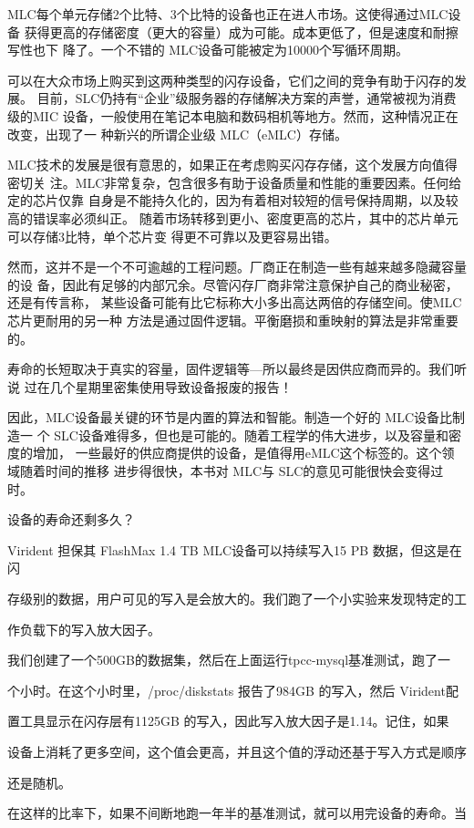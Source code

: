 MLC每个单元存储2个比特、3个比特的设备也正在进人市场。这使得通过MLC设备
获得更高的存储密度（更大的容量）成为可能。成本更低了，但是速度和耐擦写性也下
降了。一个不错的 MLC设备可能被定为10000个写循环周期。

可以在大众市场上购买到这两种类型的闪存设备，它们之间的竞争有助于闪存的发展。
目前，SLC仍持有“企业”级服务器的存储解决方案的声誉，通常被视为消费级的MIC
设备，一般使用在笔记本电脑和数码相机等地方。然而，这种情况正在改变，出现了一
种新兴的所谓企业级 MLC（eMLC）存储。

MLC技术的发展是很有意思的，如果正在考虑购买闪存存储，这个发展方向值得密切关
注。MLC非常复杂，包含很多有助于设备质量和性能的重要因素。任何给定的芯片仅靠
自身是不能持久化的，因为有着相对较短的信号保持周期，以及较高的错误率必须纠正。
随着市场转移到更小、密度更高的芯片，其中的芯片单元可以存储3比特，单个芯片变
得更不可靠以及更容易出错。

然而，这并不是一个不可逾越的工程问题。厂商正在制造一些有越来越多隐藏容量的设
备，因此有足够的内部冗余。尽管闪存厂商非常注意保护自己的商业秘密，还是有传言称，
某些设备可能有比它标称大小多出高达两倍的存储空间。使MLC芯片更耐用的另一种
方法是通过固件逻辑。平衡磨损和重映射的算法是非常重要的。

寿命的长短取决于真实的容量，固件逻辑等—所以最终是因供应商而异的。我们听说
过在几个星期里密集使用导致设备报废的报告！

因此，MLC设备最关键的环节是内置的算法和智能。制造一个好的 MLC设备比制造一
个 SLC设备难得多，但也是可能的。随着工程学的伟大进步，以及容量和密度的增加，
一些最好的供应商提供的设备，是值得用eMLC这个标签的。这个领域随着时间的推移
进步得很快，本书对 MLC与 SLC的意见可能很快会变得过时。

设备的寿命还剩多久？

Virident 担保其 FlashMax 1.4 TB MLC设备可以持续写入15 PB 数据，但这是在闪

存级别的数据，用户可见的写入是会放大的。我们跑了一个小实验来发现特定的工

作负载下的写入放大因子。

我们创建了一个500GB的数据集，然后在上面运行tpcc-mysql基准测试，跑了一

个小时。在这个小时里，/proc/diskstats 报告了984GB 的写入，然后 Virident配

置工具显示在闪存层有1125GB 的写入，因此写入放大因子是1.14。记住，如果

设备上消耗了更多空间，这个值会更高，并且这个值的浮动还基于写入方式是顺序

还是随机。

在这样的比率下，如果不间断地跑一年半的基准测试，就可以用完设备的寿命。当


